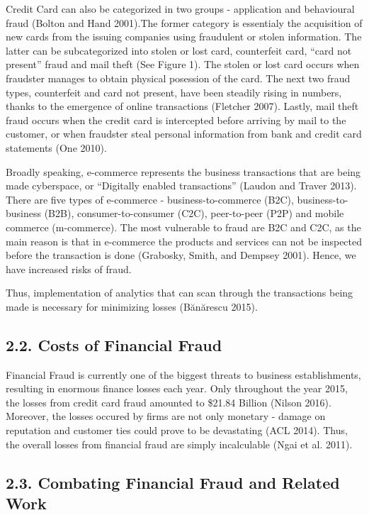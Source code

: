 \documentclass[12pt,]{article}
\begin{document}
Credit Card can also be categorized in two groups - application and
behavioural fraud (Bolton and Hand 2001).The former category is
essentialy the acquisition of new cards from the issuing companies using
fraudulent or stolen information. The latter can be subcategorized into
stolen or lost card, counterfeit card, ``card not present'' fraud and
mail theft (See Figure 1). The stolen or lost card occurs when fraudster
manages to obtain physical posession of the card. The next two fraud
types, counterfeit and card not present, have been steadily rising in
numbers, thanks to the emergence of online transactions (Fletcher 2007).
Lastly, mail theft fraud occurs when the credit card is intercepted
before arriving by mail to the customer, or when fraudster steal
personal information from bank and credit card statements (One 2010).

Broadly speaking, e-commerce represents the business transactions that
are being made cyberspace, or ``Digitally enabled transactions'' (Laudon
and Traver 2013). There are five types of e-commerce -
business-to-commerce (B2C), business-to-business (B2B),
consumer-to-consumer (C2C), peer-to-peer (P2P) and mobile commerce
(m-commerce). The most vulnerable to fraud are B2C and C2C, as the main
reason is that in e-commerce the products and services can not be
inspected before the transaction is done (Grabosky, Smith, and Dempsey
2001). Hence, we have increased risks of fraud.

Thus, implementation of analytics that can scan through the transactions
being made is necessary for minimizing losses (Bănărescu 2015).

\hypertarget{costs-of-financial-fraud}{%
\subsection{2.2. Costs of Financial
Fraud}\label{costs-of-financial-fraud}}

Financial Fraud is currently one of the biggest threats to business
establishments, resulting in enormous finance losses each year. Only
throughout the year 2015, the losses from credit card fraud amounted to
\$21.84 Billion (Nilson 2016). Moreover, the losses occured by firms are
not only monetary - damage on reputation and customer ties could prove
to be devastating (ACL 2014). Thus, the overall losses from financial
fraud are simply incalculable (Ngai et al. 2011).

\hypertarget{combating-financial-fraud-and-related-work}{%
\subsection{2.3. Combating Financial Fraud and Related
Work}\label{combating-financial-fraud-and-related-work}}
\end{document}
